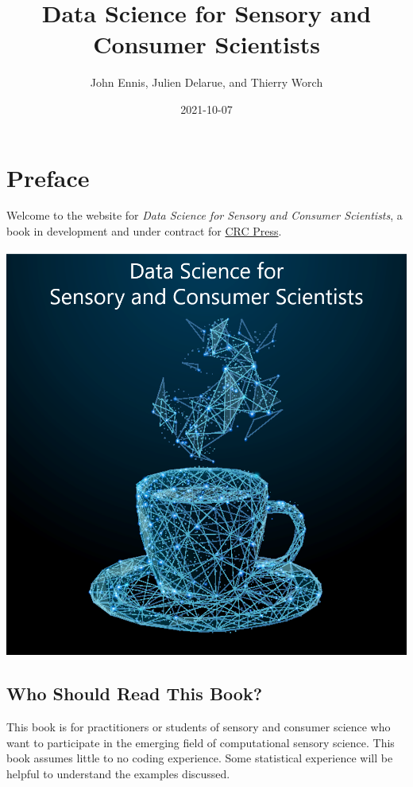 \documentclass[
]{book}
\title{Data Science for Sensory and Consumer Scientists}
\author{John Ennis, Julien Delarue, and Thierry Worch}
\date{2021-10-07}
\begin{document}
\maketitle

{
\setcounter{tocdepth}{1}
\tableofcontents
}
\hypertarget{preface}{%
\chapter*{Preface}\label{preface}}

Welcome to the website for \emph{Data Science for Sensory and Consumer Scientists}, a book in development and under contract for \href{https://www.routledge.com/}{CRC Press}.

\begin{center}\includegraphics[width=13.44in]{images/cover_art} \end{center}

\hypertarget{who-should-read-this-book}{%
\section*{Who Should Read This Book?}\label{who-should-read-this-book}}

This book is for practitioners or students of sensory and consumer science who want to participate in the emerging field of computational sensory science. This book assumes little to no coding experience. Some statistical experience will be helpful to understand the examples discussed.
\end{document}
